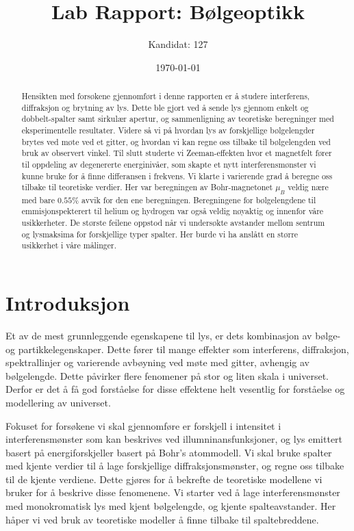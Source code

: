 \documentclass[reprint,norsk,notitlepage,floatfix]{revtex4-2}
\begin{document}
\title{Lab Rapport: Bølgeoptikk}
\author{Kandidat: 127}
\date{\today}
\affiliation{}



\begin{abstract}
    Hensikten med forsøkene gjennomført i denne rapporten er å studere interferens, diffraksjon og brytning av lys. Dette ble gjort ved å sende lys gjennom enkelt og dobbelt-spalter samt sirkulær apertur, og sammenligning av teoretiske beregninger med eksperimentelle resultater. Videre så vi på hvordan lys av forskjellige bølgelengder brytes ved møte ved et gitter, og hvordan vi kan regne oss tilbake til bølgelengden ved bruk av observert vinkel. Til slutt studerte vi Zeeman-effekten hvor et magnetfelt fører til oppdeling av degenererte energinivåer, som skapte et nytt interferensmønster vi kunne bruke for å finne differansen i frekvens. Vi klarte i varierende grad å beregne oss tilbake til teoretiske verdier. Her var beregningen av Bohr-magnetonet $μ_B$ veldig nære med bare $0.55\%$ avvik for den ene beregningen. Beregningene for bølgelengdene til emmisjonspekterert til helium og hydrogen var også veldig nøyaktig og innenfor våre usikkerheter. De største feilene oppstod når vi undersøkte avstander mellom sentrum og lysmaksima for forskjellige typer spalter. Her burde vi ha anslått en større usikkerhet i våre målinger. 
\end{abstract}
\maketitle

\section{Introduksjon} \label{sec: introduksjon}
  Et av de mest grunnleggende egenskapene til lys, er dets kombinasjon av bølge- og partikkelegenskaper. Dette fører til mange effekter som interferens, diffraksjon, spektrallinjer og varierende avbøyning ved møte med gitter, avhengig av bølgelengde. Dette påvirker flere fenomener på stor og liten skala i universet. Derfor er det å få god forståelse for disse effektene helt vesentlig for forståelse og modellering av universet. 
  
  Fokuset for forsøkene vi skal gjennomføre er forskjell i intensitet i interferensmønster som kan beskrives ved illumninansfunksjoner, og lys emittert basert på energiforskjeller basert på Bohr's atommodell. Vi skal bruke spalter med kjente verdier til å lage forskjellige diffraksjonsmønster, og regne oss tilbake til de kjente verdiene. Dette gjøres for å bekrefte de teoretiske modellene vi bruker for å beskrive disse fenomenene. Vi starter ved å lage interferensmønster med monokromatisk lys med kjent bølgelengde, og kjente spalteavstander. Her håper vi ved bruk av teoretiske modeller å finne tilbake til spaltebreddene. 
  
\end{document}
